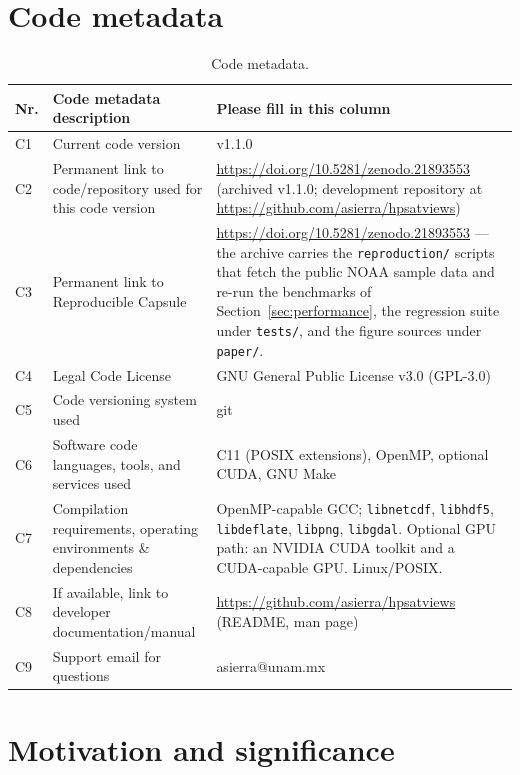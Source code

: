 \documentclass[preprint,12pt]{elsarticle}
\begin{document}
\section*{Code metadata}

\begin{table}[!ht]
\centering
\caption{Code metadata.}
\label{tab:codeMeta}
\small
\begin{tabular}{@{}p{0.5cm}p{6.5cm}p{7.5cm}@{}}
\toprule
\textbf{Nr.} & \textbf{Code metadata description} & \textbf{Please fill in this column} \\
\midrule
C1 & Current code version & v1.1.0 \\
C2 & Permanent link to code/repository used for this code version &
\url{https://doi.org/10.5281/zenodo.21893553} (archived v1.1.0; development
repository at \url{https://github.com/asierra/hpsatviews}) \\
C3 & Permanent link to Reproducible Capsule &
\url{https://doi.org/10.5281/zenodo.21893553} --- the archive carries the
\texttt{reproduction/} scripts that fetch the public NOAA sample data and
re-run the benchmarks of Section~\ref{sec:performance}, the regression suite
under \texttt{tests/}, and the figure sources under \texttt{paper/}. \\
C4 & Legal Code License & GNU General Public License v3.0 (GPL-3.0) \\
C5 & Code versioning system used & git \\
C6 & Software code languages, tools, and services used &
C11 (POSIX extensions), OpenMP, optional CUDA, GNU Make \\
C7 & Compilation requirements, operating environments \& dependencies &
OpenMP-capable GCC; \texttt{libnetcdf}, \texttt{libhdf5}, \texttt{libdeflate},
\texttt{libpng}, \texttt{libgdal}. Optional GPU path: an
NVIDIA CUDA toolkit and a CUDA-capable GPU. Linux/POSIX. \\
C8 & If available, link to developer documentation/manual &
\url{https://github.com/asierra/hpsatviews} (README, man page) \\
C9 & Support email for questions & asierra@unam.mx \\
\bottomrule
\end{tabular}
\end{table}

\section{Motivation and significance}
\label{sec:motivation}
\end{document}
